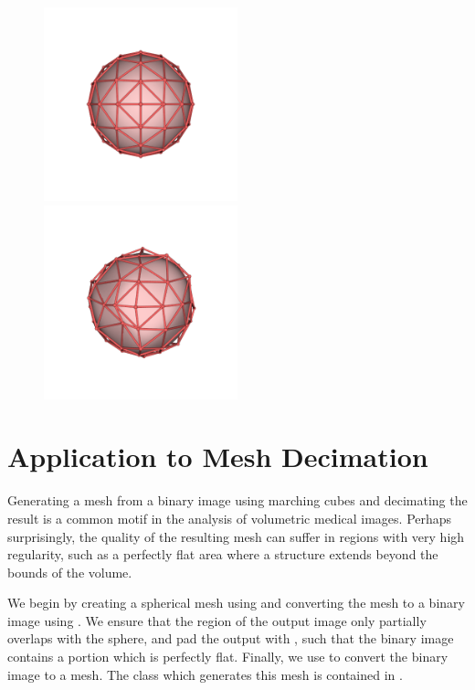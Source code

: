 \documentclass{InsightArticle}
\begin{document}
\begin{figure}
\includegraphics[width=0.5\textwidth]{images/sphere_clean.png}
\includegraphics[width=0.5\textwidth]{images/sphere_noise.png}
\label{fig:BasicUsage}
\end{figure}

\section{Application to Mesh Decimation}

Generating a mesh from a binary image using marching cubes and decimating the result is a common motif in the analysis of volumetric medical images.  Perhaps surprisingly, the quality of the resulting mesh can suffer in regions with very high regularity, such as a perfectly flat area where a structure extends beyond the bounds of the volume.

We begin by creating a spherical mesh using  and converting the mesh to a binary image using .  We ensure that the region of the output image only partially overlaps with the sphere, and pad the output with , such that the binary image contains a portion which is perfectly flat.  Finally, we use  to convert the binary image to a mesh.  The class which generates this mesh is contained in .
\end{document}
